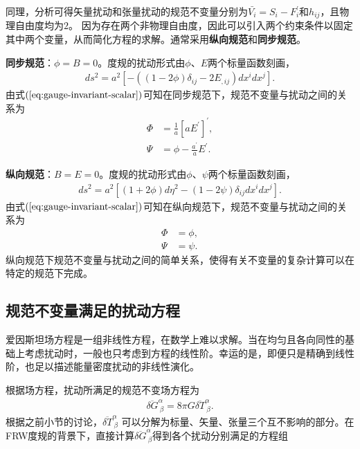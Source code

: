 同理，分析可得矢量扰动和张量扰动的规范不变量分别为$\bar{V_{i}}=S_{i}-F^\prime_{i}$和$h_{ij}$，且物理自由度均为$2$。
因为存在两个非物理自由度，因此可以引入两个约束条件以固定其中两个变量，从而简化方程的求解。通常采用\textbf{纵向规范}和\textbf{同步规范}。

\textbf{同步规范}：$\phi=B=0$。度规的扰动形式由$\phi$、$E$两个标量函数刻画，
\begin{align}
	\label{eq:synchronous-gauge-metric}
	ds^2=a^2{\left[-((1-2\phi)\delta_{ij}-2E_{,ij})dx^{i}dx^{j}\right]}.
\end{align}
由式$(\ref{eq:gauge-invariant-scalar})$可知在同步规范下，规范不变量与扰动之间的关系为
\begin{align}
	\Phi & =\frac{1}{a}{\left[aE^\prime\right]}^{\prime}, \\
	\Psi & =\phi-\frac{a^\prime}{a}E^\prime.
\end{align}

\textbf{纵向规范}：$B=E=0$。度规的扰动形式由$\phi$、$\psi$两个标量函数刻画，
\begin{align}
	ds^2=a^2{\left[(1+2\phi)d\eta^2-(1-2\psi)\delta_{ij}dx^{i}dx^{j}\right]}.
\end{align}
由式$(\ref{eq:gauge-invariant-scalar})$可知在纵向规范下，规范不变量与扰动之间的关系为
\begin{align}
	\Phi & = \phi,  \\
	\Psi & = \psi.
\end{align}
纵向规范下规范不变量与扰动之间的简单关系，使得有关不变量的复杂计算可以在特定的规范下完成。

\subsection{规范不变量满足的扰动方程}
爱因斯坦场方程是一组非线性方程，在数学上难以求解。当在均匀且各向同性的基础上考虑扰动时，一般也只考虑到方程的线性阶。幸运的是，即便只是精确到线性阶，也足以描述能量密度扰动的非线性演化。

根据场方程，扰动所满足的规范不变场方程为
\begin{align}
	\label{eq:gauge-invariant-perturbation-equation}
	\overline{\delta G}^{\alpha}_{~\beta}=8\pi G\overline{\delta
		T}^{\alpha}_{~\beta}.
\end{align}
根据之前小节的讨论，$\overline{\delta
		T}^{\alpha}_{~\beta}$
可以分解为标量、矢量、张量三个互不影响的部分。在FRW度规的背景下，直接计算$\overline{\delta
		G}^{\alpha}_{~\beta}$得到各个扰动分别满足的方程组

